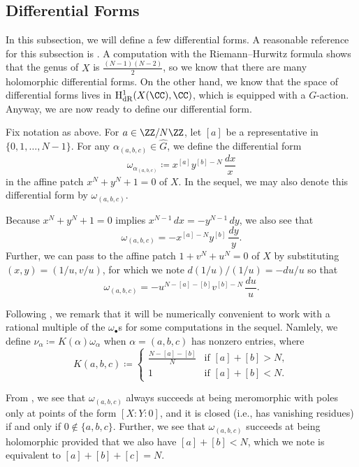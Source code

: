 \documentclass[../thesis.tex]{subfiles}
\begin{document}
\subsection{Differential Forms}
In this subsection, we will define a few differential forms. A reasonable reference for this subsection is \cite[Section~1.7]{lang-cm}. A computation with the Riemann--Hurwitz formula shows that the genus of $X$ is $\frac{(N-1)(N-2)}2$, so we know that there are many holomorphic differential forms. On the other hand, we know that the space of differential forms lives in $\mathrm H^1_{\mathrm{dR}}(X(\CC),\CC)$, which is equipped with a $G$-action. Anyway, we are now ready to define our differential form.
\begin{definition}
	Fix notation as above. For $a\in\ZZ/N\ZZ$, let $[a]$ be a representative in $\{0,1,\ldots,N-1\}$. For any $\alpha_{(a,b,c)}\in\widehat G$, we define the differential form
	\[\omega_{\alpha_{(a,b,c)}}\coloneqq x^{[a]}y^{[b]-N}\,\frac{dx}x\]
	in the affine patch $x^N+y^N+1=0$ of $X$. In the sequel, we may also denote this differential form by $\omega_{(a,b,c)}$.
\end{definition}
\begin{remark} \label{rem:omega-a-b-c-patches}
	Because $x^N+y^N+1=0$ implies $x^{N-1}\,dx=-y^{N-1}\,dy$, we also see that
	\[\omega_{(a,b,c)}=-x^{[a]-N}y^{[b]}\,\frac{dy}y.\]
	Further, we can pass to the affine patch $1+v^N+u^N=0$ of $X$ by substituting $(x,y)=(1/u,v/u)$, for which we note $d(1/u)/(1/u)=-du/u$ so that
	\[\omega_{(a,b,c)}=-u^{N-[a]-[b]}v^{[b]-N}\,\frac{du}u.\]
\end{remark}
\begin{remark} \label{rem:coleman-differentials}
	Following \cite[Section~VI]{coleman-g-k-formula}, we remark that it will be numerically convenient to work with a rational multiple of the $\omega_\bullet$s for some computations in the sequel. Namlely, we define $\nu_\alpha\coloneqq K(\alpha)\omega_{\alpha}$ when $\alpha=(a,b,c)$ has nonzero entries, where
	\[K(a,b,c)\coloneqq\begin{cases}
		\frac{N-[a]-[b]}N & \text{if }[a]+[b]>N, \\
		1 & \text{if }[a]+[b]<N.
	\end{cases}\]
\end{remark}
From , we see that $\omega_{(a,b,c)}$ always succeeds at being meromorphic with poles only at points of the form $[X:Y:0]$, and it is closed (i.e., has vanishing residues) if and only if $0\notin\{a,b,c\}$. Further, we see that $\omega_{(a,b,c)}$ succeeds at being holomorphic provided that we also have $[a]+[b]<N$, which we note is equivalent to $[a]+[b]+[c]=N$.
\end{document}

